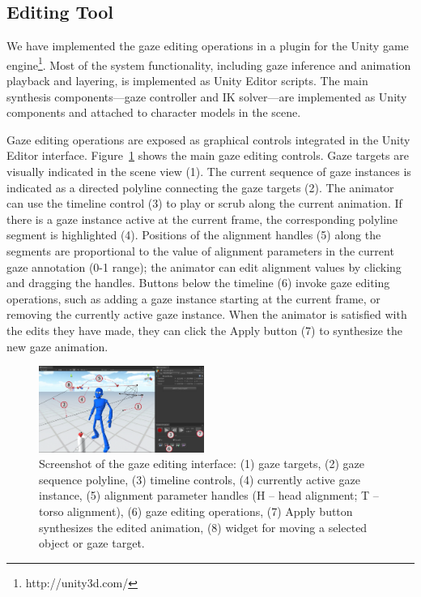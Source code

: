 \subsection{Editing Tool}

We have implemented the gaze editing operations in a plugin for the Unity game engine\footnote{http://unity3d.com/}. Most of the system functionality, including gaze inference and animation playback and layering, is implemented as Unity Editor scripts. The main synthesis components---gaze controller and IK solver---are implemented as Unity components and attached to character models in the scene.

Gaze editing operations are exposed as graphical controls integrated in the Unity Editor interface. Figure~\ref{fig:GazeEditingTool} shows the main gaze editing controls. Gaze targets are visually indicated in the scene view (1). The current sequence of gaze instances is indicated as a directed polyline connecting the gaze targets (2).  The animator can use the timeline control (3) to play or scrub along the current animation. If there is a gaze instance active at the current frame, the corresponding polyline segment is highlighted (4). Positions of the alignment handles (5) along the segments are proportional to the value of alignment parameters in the current gaze annotation (0-1 range); the animator can edit alignment values by clicking and dragging the handles. Buttons below the timeline (6) invoke gaze editing operations, such as adding a gaze instance starting at the current frame, or removing the currently active gaze instance. When the animator is satisfied with the edits they have made, they can click the Apply button (7) to synthesize the new gaze animation.

\begin{figure}
\centering
\includegraphics[width=0.48\textwidth]{Figures/GazeEditingTool.pdf}
\caption{Screenshot of the gaze editing interface: (1) gaze targets, (2) gaze sequence polyline, (3) timeline controls, (4) currently active gaze instance, (5) alignment parameter handles (H -- head alignment; T -- torso alignment), (6) gaze editing operations, (7) Apply button synthesizes the edited animation, (8) widget for moving a selected object or gaze target.}
\label{fig:GazeEditingTool}
\end{figure}

